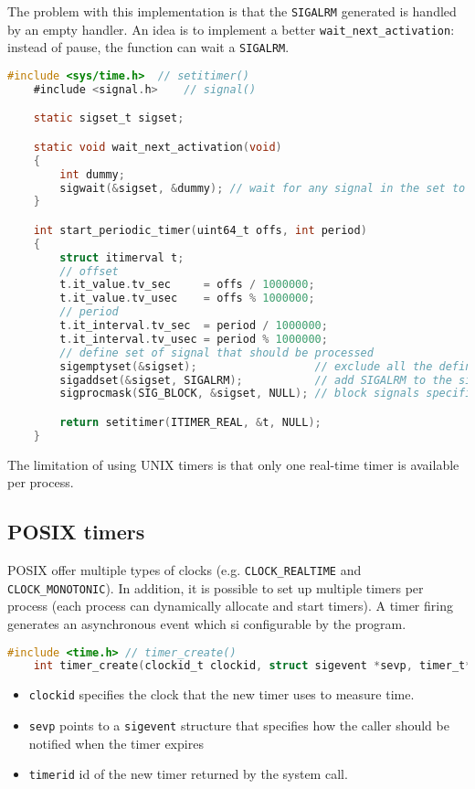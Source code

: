 The problem with this implementation is that the \texttt{SIGALRM} generated is handled by an empty handler. An idea is to implement a better \texttt{wait\_next\_activation}: instead of pause, the function can wait a \texttt{SIGALRM}.


\begin{lstlisting}[language=C]
    #include <sys/time.h>  // setitimer()
    #include <signal.h>    // signal()

    static sigset_t sigset;

    static void wait_next_activation(void)
    {
        int dummy;
        sigwait(&sigset, &dummy); // wait for any signal in the set to be pending
    }

    int start_periodic_timer(uint64_t offs, int period)
    {
        struct itimerval t;
        // offset
        t.it_value.tv_sec     = offs / 1000000;
        t.it_value.tv_usec    = offs % 1000000;
        // period
        t.it_interval.tv_sec  = period / 1000000;
        t.it_interval.tv_usec = period % 1000000;
        // define set of signal that should be processed
        sigemptyset(&sigset);                  // exclude all the defined signals
        sigaddset(&sigset, SIGALRM);           // add SIGALRM to the signal set
        sigprocmask(SIG_BLOCK, &sigset, NULL); // block signals specified in sigset (required by sigwait)

        return setitimer(ITIMER_REAL, &t, NULL);
    }
\end{lstlisting}

The limitation of using UNIX timers is that only one real-time timer is available per process.

\subsection{POSIX timers}
POSIX offer multiple types of clocks (e.g. \texttt{CLOCK\_REALTIME} and \texttt{CLOCK\_MONOTONIC}). In addition, it is possible to set up multiple timers per process (each process can dynamically allocate and start timers).
A timer firing generates an asynchronous event which si configurable by the program.

\begin{lstlisting}[language=C]
    #include <time.h> // timer_create()
    int timer_create(clockid_t clockid, struct sigevent *sevp, timer_t* timerid);
\end{lstlisting}
\begin{itemize}
    \item \texttt{clockid} specifies the clock that the new timer uses to measure time.
    \item \texttt{sevp} points to a \texttt{sigevent} structure that specifies how the caller should be notified when the timer expires
    \item \texttt{timerid} id of the new timer returned by the system call.
\end{itemize}

